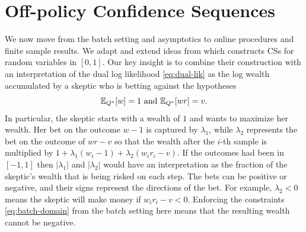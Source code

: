 \section{Off-policy Confidence Sequences}
We now move from the batch setting and asymptotics to online procedures and
finite sample results.  We adapt and extend ideas from
\cite{waudby-smith_variance-adaptive_2020} which constructs 
CSs for random variables in $[0,1]$.  
Our key insight is to combine their construction with 
an interpretation of the dual log likelihood \eqref{eq:dual-lik} 
as the log wealth accumulated by a
skeptic who is betting against the hypotheses 
\[
\mathbb{E}_{Q^*}[w]=1 \text{ and } \mathbb{E}_{Q^*}[wr]=v.
\]
In particular, the skeptic starts with a wealth of $1$ and wants to maximize
her wealth. Her bet on the outcome $w-1$ is captured by $\lambda_1$, while
$\lambda_2$ represents the bet on the outcome of $wr-v$ so that the wealth
after the $i$-th sample is multiplied by $1+\lambda_1(w_i-1)+\lambda_2 (w_i r_i
-v)$. If the outcomes had been in $[-1,1]$ then $|\lambda_1|$ and $|\lambda_2|$
would have an interpretation as the fraction of the skeptic's wealth that is
being risked on each step. The bets can be positive or negative, and their
signs represent the directions of the bet. For example, $\lambda_2<0$ means the
skeptic will make money if $w_ir_i-v<0$.  Enforcing the constraints
\eqref{eq:batch-domain} from the batch setting here means that the resulting
wealth cannot be negative.


